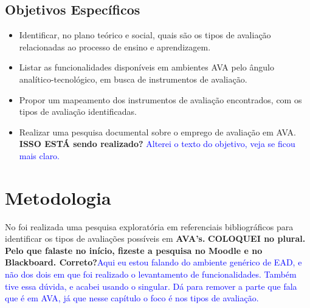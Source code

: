 

\subsection{Objetivos Específicos}%

\begin{itemize}
	\item Identificar, no plano teórico e social, quais são os tipos de avaliação relacionadas ao processo de ensino e aprendizagem.
	\item Listar as funcionalidades disponíveis em ambientes AVA pelo ângulo analítico-tecnológico, em busca de instrumentos de avaliação.
	\item Propor um mapeamento dos instrumentos de avaliação encontrados, com os tipos de avaliação identificadas.
	\item Realizar uma pesquisa documental sobre o emprego de avaliação em AVA.
	\textbf{ISSO ESTÁ sendo realizado?} \textcolor{blue}{Alterei o texto do objetivo, veja se ficou mais claro.}
\end{itemize}


\section{Metodologia}%
No  foi realizada uma pesquisa exploratória em referenciais bibliográficos para identificar os tipos de avaliações possíveis em\textbf{ AVA's.} \textbf{COLOQUEI no plural. Pelo que falaste no início, fizeste a pesquisa no Moodle e no Blackboard. Correto?}\textcolor{blue} {Aqui eu estou falando do ambiente genérico de EAD, e não dos dois em que foi realizado o levantamento de funcionalidades. Também tive essa dúvida, e acabei usando o singular. Dá para remover a parte que fala que é em AVA, já que nesse capítulo o foco é nos tipos de avaliação.}

